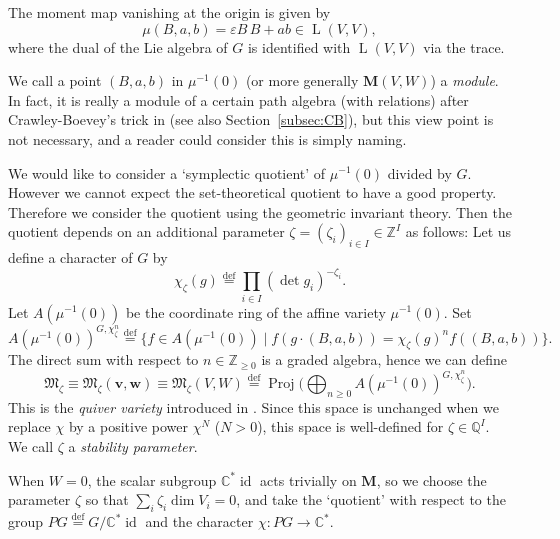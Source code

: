 \documentclass[pdftex]{sigma}
\theoremstyle{definition}
\numberwithin{equation}{section}
\newcommand{\subsecref}[1]{Section~\ref{#1}}
\newcommand{\defeq}{\overset{\operatorname{\scriptstyle def}}{=}}
\newcommand{\C}{{\mathbb C}}
\newcommand{\Z}{{\mathbb Z}}
\newcommand{\Q}{{\mathbb Q}}
\newcommand{\bM}{{\mathbf M}} %
\newcommand{\M}{{\mathfrak M}} %
\newcommand{\bv}{{\mathbf v}} %
\newcommand{\bw}{{\mathbf w}} %
\newcommand{\HomL}{\operatorname{L}}
\begin{document}
The moment map vanishing at the origin is given by
\begin{equation}
  \mu(B, a, b) = \varepsilon B\, B + ab \in \HomL(V, V),
\end{equation}
where the dual of the Lie algebra of $G$ is identif\/ied with
$\HomL(V, V)$ via the trace.

We call a point $(B,a,b)$ in $\mu^{-1}(0)$ (or more generally
$\bM(V,W)$) a {\it module}. In fact, it is really a module of a
certain path algebra (with relations) after Crawley-Boevey's trick in
\cite[{the end of Introduction}]{CB} (see also \subsecref{subsec:CB}),
but this view point is not necessary, and a reader could consider this
is simply naming.

We would like to consider a `symplectic quotient' of $\mu^{-1}(0)$
divided by $G$.
However we cannot expect the set-theoretical quotient
to have a good property. Therefore we consider the quotient using the
geometric invariant theory. Then the quotient depends on an additional
parameter $\zeta = (\zeta_i)_{i\in I}\in \Z^I$ as follows:
%
Let us def\/ine a character of $G$ by
\begin{equation*}
  \chi_\zeta(g) \defeq \prod_{i\in I} \left(\det g_i\right)^{-\zeta_i}.
\end{equation*}
Let $A(\mu^{-1}(0))$ be the coordinate ring of the af\/f\/ine variety
$\mu^{-1}(0)$. Set
\begin{equation*}
   A(\mu^{-1}(0))^{G,\chi_\zeta^n}
   \defeq \{ f\in A(\mu^{-1}(0)) \mid f(g\cdot(B,a,b))
   = \chi_\zeta(g)^n f((B,a,b)) \}.
\end{equation*}
The direct sum with respect to $n\in\Z_{\ge 0}$ is a graded algebra,
hence we can def\/ine
\begin{equation*}
   \M_\zeta \equiv \M_\zeta(\bv,\bw) \equiv \M_\zeta(V,W)
   \defeq \operatorname{Proj}\Big(\bigoplus_{n\ge 0}
   A(\mu^{-1}(0))^{G,\chi_\zeta^n}\Big).
\end{equation*}
This is the {\it quiver variety\/} introduced in \cite{Na-quiver}.
Since this space is unchanged when we replace $\chi$ by a positive power
$\chi^N$ ($N > 0$), this space is well-def\/ined for $\zeta\in \Q^I$.
We call $\zeta$ a {\it stability parameter}.

When $W = 0$, the scalar subgroup $\C^*\operatorname{id}$ acts
trivially on $\bM$, so we choose the parameter $\zeta$ so that
$\sum_i \zeta_i \dim V_i = 0$, and take the `quotient' with respect to
the group $PG \defeq G/\C^*\operatorname{id}$ and the character
$\chi\colon PG\to \C^*$.
\end{document}

